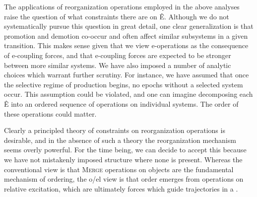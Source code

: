   The applications of reorganization operations employed in the above analyses raise the question of what constraints there are on Ê. Although we do not systematically pursue this question in great detail, one clear generalization is that promotion and demotion co-occur and often affect similar subsystems in a given transition. This makes sense given that we view e-operations as the consequence of e-coupling forces, and that e-coupling forces are expected to be stronger between more similar systems. We have also imposed a number of analytic choices which warrant further scrutiny. For instance, we have assumed that once the selective regime of production begins, no epochs without a selected system occur. This assumption could be violated, and one can imagine decomposing each Ê into an ordered sequence of operations on individual systems. The order of these operations could matter.

  Clearly a principled theory of constraints on reorganization operations is desirable, and in the absence of such a theory the reorganization mechanism seems overly powerful. For the time being, we can decide to accept this because we have not mistakenly imposed structure where none is present. Whereas the conventional view is that \textsc{Merge} operations on objects are the fundamental mechanism of ordering, the o/el view is that order emerges from operations on relative excitation, which are ultimately forces which guide trajectories in a .

